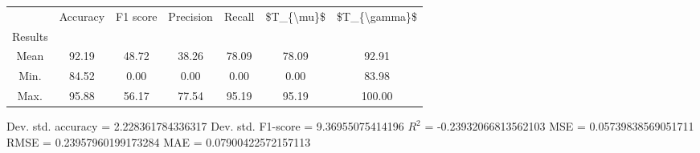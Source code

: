 \begin{tabular}{|c|c|c|c|c|c|c|}
\toprule
{} &  Accuracy &  F1 score &  Precision &  Recall &  \$T\_\{\textbackslash mu\}\$ &  \$T\_\{\textbackslash gamma\}\$ \\
Results &           &           &            &         &            &               \\
\hline
Mean    &     92.19 &     48.72 &      38.26 &   78.09 &      78.09 &         92.91 \\
Min.    &     84.52 &      0.00 &       0.00 &    0.00 &       0.00 &         83.98 \\
Max.    &     95.88 &     56.17 &      77.54 &   95.19 &      95.19 &        100.00 \\
\bottomrule
\end{tabular}

 Dev. std. accuracy = 2.228361784336317
 Dev. std. F1-score = 9.36955075414196
 $R^2$ = -0.23932066813562103
 MSE = 0.05739838569051711
 RMSE = 0.23957960199173284
 MAE = 0.07900422572157113
